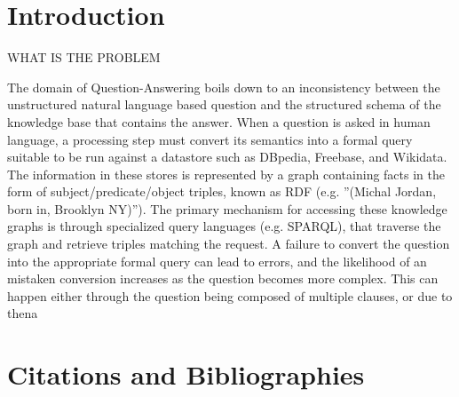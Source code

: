 \documentclass[sigplan,screen]{acmart}
\begin{document}
\section{Introduction}
WHAT IS THE PROBLEM

The domain of Question-Answering boils down to an inconsistency between the unstructured natural language based question and the structured schema of the knowledge base that contains the answer. When a question is asked in human language, a processing step must convert its semantics into a formal query suitable to be run against a datastore such as DBpedia, Freebase, and Wikidata. The information in these stores is represented by a graph containing facts in the form of subject/predicate/object triples, known as RDF (e.g. ''(Michal Jordan, born in, Brooklyn NY)''). The primary mechanism for accessing these knowledge graphs is through specialized query languages (e.g. SPARQL), that traverse the graph and retrieve triples matching the request. A failure to convert the question into the appropriate formal query can lead to errors, and the likelihood of an mistaken conversion increases as the question becomes more complex. This can happen either through the question being composed of multiple clauses, or due to thena

\section{Citations and Bibliographies}
\nocite{*}


\end{document}
